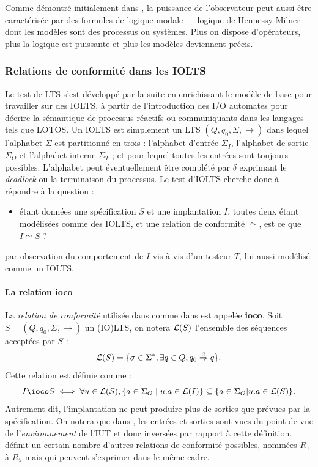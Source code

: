 Comme d\'emontr\'e initialement dans \cite{obs-test-equiv}, la
puissance de l'observateur peut aussi \^etre caract\'eris\'ee par
des formules de logique modale --- logique de Hennessy-Milner --- dont
les mod\`eles sont des processus ou syst\`emes. Plus on dispose
d'op\'erateurs, plus la logique est puissante et plus les mod\`eles
deviennent pr\'ecis. 

\subsubsection{Relations de conformit\'e dans les \textsf{IOLTS}}

Le test de \textsf{LTS} s'est d\'evelopp\'e par la suite en enrichissant le
mod\`ele de base pour travailler sur des \textsf{IOLTS}, \`a partir de
l'introduction des I/O automates
\cite{intro-ioautomata,garland00using} pour d\'ecrire la
s\'emantique de processus r\'eactifs ou communiquants dans les
langages tels que LOTOS. Un \textsf{IOLTS} est simplement un
\textsf{LTS} $(Q,q_0,\Sigma,\rightarrow)$  dans lequel l'alphabet $\Sigma$
est partitionn\'e en trois : l'alphabet d'entr\'ee $\Sigma_I$,
l'alphabet de sortie $\Sigma_O$ et l'alphabet interne $\Sigma_T$ ; et pour lequel toutes les entr\'ees
sont toujours possibles. L'alphabet peut \'eventuellement
\^etre compl\'et\'e par $\delta$ exprimant le \emph{deadlock} ou la
terminaison du processus. Le test d'\textsf{IOLTS} cherche donc \`a
r\'epondre \`a la question : 
\begin{itemize}
  \item \'etant donn\'ees une sp\'ecification $S$ et une
  implantation $I$, toutes deux \'etant mod\'elis\'ees comme des
  \textsf{IOLTS}, et une relation de conformit\'e $\simeq$, est ce que
  $I\simeq S$ ?
\end{itemize}
par observation du comportement de $I$ vis \`a vis d'un testeur $T$,
lui aussi mod\'elis\'e comme un \textsf{IOLTS}. 

\paragraph{La relation \textbf{ioco}}

La \emph{relation de
  conformit\'e} utilis\'ee dans \cite{tgv} comme dans
\cite{auto-test-fm} est appel\'ee \textbf{ioco}. Soit
  $S=(Q,q_0,\Sigma,\rightarrow)$ un \textsf{(IO)LTS}, on notera ${\cal
  L}(S)$ l'ensemble des s\'equences accept\'ees par $S$ :
$$
{\cal L}(S) = \{\sigma \in \Sigma^*, \exists q \in Q,
q_0\stackrel{\sigma}{\Rightarrow} q\}.
$$
Cette relation est d\'efinie comme :
$$
I \ioco S \iff \forall u\in {\cal L}(S), \{a \in \Sigma_O \mid u.a \in
  {\cal L}(I)\} \subseteq \{a \in \Sigma_O | u.a \in
  {\cal L}(S)\}.
$$
Autrement dit, l'implantation ne peut produire plus de sorties que
pr\'evues par la sp\'ecification. On notera que dans \cite{tgv}, les entr\'ees et
sorties sont vues du point de vue de l'\emph{environnement} de l'\textsf{IUT} et
donc invers\'ees par rapport \`a cette d\'efinition.
\cite{thphalippou} d\'efinit un certain nombre d'autres
relations de conformit\'e possibles, nomm\'ees $R_1$ \`a
$R_5$ mais qui peuvent s'exprimer dans le m\^eme cadre. 

